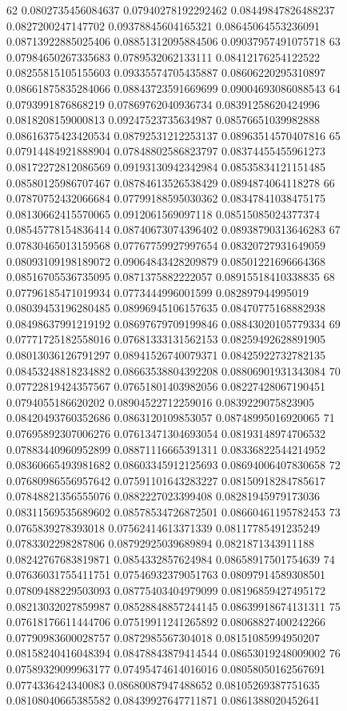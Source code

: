 62 0.0802735456084637 0.07940278192292462 0.08449847826488237 0.0827200247147702 0.09378845604165321 0.08645064553236091 0.08713922885025406 0.08851312095884506 0.09037957491075718
63 0.07984650267335683 0.0789532062133111 0.08412176254122522 0.08255815105155603 0.09335574705435887 0.08606220295310897 0.08661875835284066 0.08843723591669699 0.09004693086088543
64 0.0793991876868219 0.07869762040936734 0.08391258620424996 0.0818208159000813 0.09247523735634987 0.08576651039982888 0.08616375423420534 0.08792531212253137 0.08963514570407816
65 0.07914484921888904 0.07848802586823797 0.08374455455961273 0.08172272812086569 0.09193130942342984 0.08535834121151485 0.08580125986707467 0.08784613526538429 0.0894874064118278
66 0.07870752432066684 0.07799188595030362 0.08347841038475175 0.08130662415570065 0.0912061569097118 0.08515085024377374 0.08545778154836414 0.08740673074396402 0.08938790313646283
67 0.07830465013159568 0.07767759927997654 0.08320727931649059 0.08093109198189072 0.09064843428209879 0.08501221696664368 0.08516705536735095 0.0871375882222057 0.08915518410338835
68 0.07796185471019934 0.0773444996001599 0.082897944995019 0.08039453196280485 0.08996945106157635 0.08470775168882938 0.08498637991219192 0.08697679709199846 0.08843020105779334
69 0.07771725182558016 0.07681333131562153 0.08259492628891905 0.08013036126791297 0.08941526740079371 0.08425922732782135 0.08453248818234882 0.08663538804392208 0.08806901931343084
70 0.07722819424357567 0.07651801403982056 0.08227428067190451 0.0794055186620202 0.08904522712259016 0.0839229075823905 0.08420493760352686 0.0863120109853057 0.08748995016920065
71 0.07695892307006276 0.07613471304693054 0.08193148974706532 0.07883440960952899 0.08871116665391311 0.08336822544214952 0.08360665493981682 0.08603345912125693 0.08694006407830658
72 0.07680986556957642 0.07591101643283227 0.08150918284785617 0.07848821356555076 0.0882227023399408 0.08281945979173036 0.08311569535689602 0.08578534726872501 0.08660461195782453
73 0.0765839278393018 0.07562414613371339 0.08117785491235249 0.0783302298287806 0.08792925039689894 0.0821871343911188 0.08242767683819871 0.0854332857624984 0.08658917501754639
74 0.07636031755411751 0.07546932379051763 0.08097914589308501 0.07809488229503093 0.08775403404979099 0.08196859427495172 0.08213032027859987 0.08528848857244145 0.08639918674131311
75 0.07618176611444706 0.07519911241265892 0.08068827400242266 0.07790983600028757 0.0872985567304018 0.08151085994950207 0.08158240416048394 0.08478843879414544 0.08653019248009002
76 0.07589329099963177 0.07495474614016016 0.08058050162567691 0.0774336424340083 0.08680087947488652 0.08105269387751635 0.08108040665385582 0.08439927647711871 0.0861388020452641
